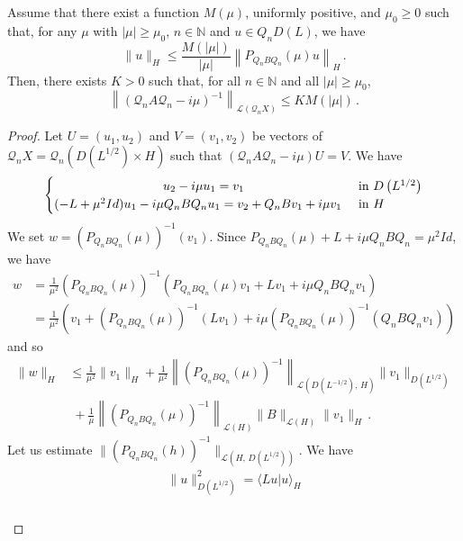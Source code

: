 \documentclass[AHL,Unicode,longabstracts]{cedram}
\newcommand{\NN}{\mathbb{N}}
\newcommand{\Lc}{\mathcal{L}}
\newcommand{\Qc}{\mathcal{Q}}
\begin{document}
\begin{prop}\label{prop-2-appendix}
Assume that there exist a function $M(\mu)$, uniformly positive, and $\mu_0\geq 0$ such that, for any $\mu$ with $|\mu|\geq
\mu_0$, $n\in\NN$ and $u\in Q_nD(L)$, we have
\begin{equation}\label{hyp-prop-2-appendix}
\|u\|_{H}\leq \frac{M(|\mu|)}{|\mu|} \left\|P_{Q_n B Q_n}(\mu)u\right\|_{H}\,.
\end{equation}
Then, there exists $K>0$ such that, for all $n\in\NN$ and all $|\mu|\geq \mu_0$,
\[
\left\|\left(\Qc_n A\Qc_n - i\mu \right)^{-1}\right\|_{\Lc(\Qc_nX)}\leq
K M(|\mu|)\,.
\]
\end{prop}
\begin{proof}
Let $U=(u_1,u_2)$ and $V=(v_1,v_2)$ be vectors of $\Qc_n X=\Qc_n (D(L^{1/2})\times H)$ such that $(\Qc_n A\Qc_n - i\mu)U=V$. We have
\begin{equation}\label{eq-demo-prop-2-appendix-1}
\begin{cases}
\mkern156mu u_2 -i\mu u_1 = v_1 & \text{ in }D\left(L^{1/2}\right)\\
(-L+\mu^2 Id) u_1-i\mu Q_n B Q_n u_1 = v_2 + Q_n B v_1 + i \mu v_1&\text{ in }H
\end{cases}
\end{equation}
We set $w=\left(P_{Q_n B Q_n}(\mu)\right)^{-1}(v_1)$. Since $P_{Q_n B Q_n}(\mu)+ L +i\mu Q_n BQ_n=\mu^2 Id$, we have
\begin{align*}
w&=\frac 1{\mu^2}\left(P_{Q_n B Q_n}(\mu)\right)^{-1}\left(P_{Q_n B Q_n}(\mu)v_1+ L v_1+i\mu Q_n B Q_n v_1\right)\\
&= \frac 1{\mu^2} \left(v_1+(P_{Q_n B Q_n}(\mu))^{-1}(L v_1)+i\mu (P_{Q_n B Q_n}(\mu))^{-1} (Q_n B Q_n v_1)\right)
\end{align*}
and so
\begin{equation}\label{eq-demo-prop-2-appendix-2}
\begin{aligned}
\|w\|_{H} &\leq \frac 1{\mu^2}\|v_1\|_{H} + \frac 1{\mu^2} \left\|(P_{Q_n B Q_n}(\mu))^{-1}\right\|_{\Lc\left(D(L^{-1/2}),\,H\right)} \|v_1\|_{D(L^{1/2})}\\
&\;+ \frac {1}\mu \left\|(P_{Q_n B Q_n}(\mu))^{-1}\right\|_{\Lc(H)} \| B \|_{\Lc(H)}
\|v_1\|_{H}\,.
\end{aligned}
\end{equation}
Let us estimate $\|(P_{Q_n B Q_n}(h))^{-1}\|_{\Lc(H,\,D(L^{1/2}))}$. We have
\begin{multline*}
\|u\|_{D(L^{1/2})}^2=\langle L u |u\rangle_{H}\\
\begin{aligned}

\end{aligned}
\end{multline*}
\end{proof}
\end{document}
